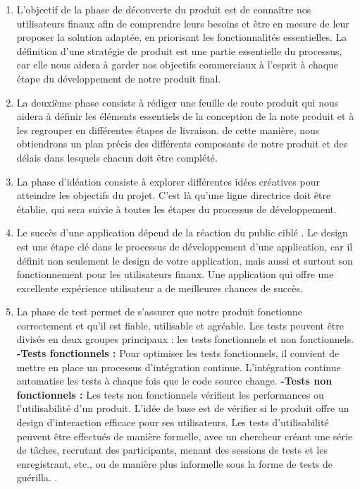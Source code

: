 \begin{enumerate}
	\item L'objectif de la phase de découverte du produit est de connaître nos utilisateurs finaux afin de comprendre leurs besoins et être en mesure de leur proposer la solution adaptée, en priorisant les fonctionnalités essentielles. La définition d'une stratégie de produit est une partie essentielle du processus, car elle nous aidera à garder nos objectifs commerciaux à l'esprit à chaque étape du développement de notre produit final.
	
	
	\item La deuxième phase consiste à rédiger une feuille de route produit qui nous aidera à définir les éléments essentiels de la conception de la note produit et à les regrouper en différentes étapes de livraison. de cette manière, nous obtiendrons un plan précis des différents composants de notre produit et des délais dans lesquels chacun doit être complété. 
	
	
	
	
	
	\item La phase d'idéation consiste à explorer différentes idées créatives pour atteindre les objectifs du projet. C'est là qu'une ligne directrice doit être établie, qui sera suivie à toutes les étapes du processus de développement.
	
	
	
	\item Le succès d'une application dépend de la réaction du public ciblé . Le design est une étape clé dans le processus de développement d'une application, car il définit non seulement le design de votre application, mais aussi et surtout son fonctionnement pour les utilisateurs finaux. Une application qui offre une excellente expérience utilisateur a de meilleures chances de succès.
	
	
	\item La phase de test permet de s'assurer que notre produit fonctionne correctement et qu'il est fiable, utilisable et agréable. Les tests peuvent être divisés en deux groupes principaux : les tests fonctionnels et non fonctionnels.\newline
	\textbf{-Tests fonctionnels : }Pour optimiser les tests fonctionnels, il convient de mettre en place un processus d'intégration continue. L'intégration continue automatise les tests à chaque fois que le code source change.\newline
	\textbf{-Tests non fonctionnels : }Les tests non fonctionnels vérifient les performances ou l'utilisabilité d'un produit. L'idée de base est de vérifier si le produit offre un design d'interaction efficace pour ses utilisateurs. Les tests d'utilisabilité peuvent être effectués de manière formelle, avec un chercheur créant une série de tâches, recrutant des participants, menant des sessions de tests et les enregistrant, etc., ou de manière plus informelle sous la forme de tests de guérilla. .
	

\end{enumerate}
